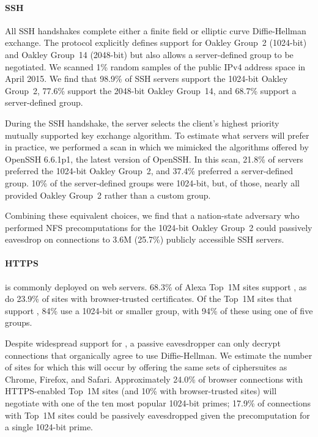 \paragraph{SSH}
All SSH handshakes complete either a finite field or elliptic curve
Diffie-Hellman exchange. The protocol explicitly defines support for Oakley
Group~2 (1024-bit) and Oakley Group~14 (2048-bit) but also allows a
server-defined group to be negotiated. We scanned 1\% random samples of the
public IPv4 address space in April 2015. We find that 98.9\% of SSH servers
support the 1024-bit Oakley Group~2, 77.6\% support the 2048-bit Oakley
Group~14, and 68.7\% support a server-defined group\@.

During the SSH handshake, the server selects the client's highest priority
mutually supported key exchange algorithm. To estimate what servers will
prefer in practice, we performed a scan in which we mimicked the algorithms
offered by OpenSSH 6.6.1p1, the latest version of OpenSSH\@. In this scan,
21.8\% of servers preferred the 1024-bit Oakley Group~2, and 37.4\% preferred
a server-defined group. 10\% of the server-defined groups were 1024-bit, but,
of those, nearly all provided Oakley Group~2 rather than a custom group.

Combining these equivalent choices, we find that a nation-state adversary who
performed NFS precomputations for the 1024-bit Oakley Group~2 could passively
eavesdrop on connections to 3.6M (25.7\%) publicly accessible SSH servers.

\paragraph{HTTPS}
\dhe is commonly deployed on web servers. 68.3\% of Alexa Top~1M sites
support \dhe, as do 23.9\% of sites with browser-trusted certificates. Of the
Top~1M sites that support \dhe, 84\% use a 1024-bit or smaller group, with
94\% of these using one of five groups.

Despite widespread support for \dhe, a passive eavesdropper can only decrypt
connections that organically agree to use Diffie-Hellman. We estimate the
number of sites for which this will occur by offering the same sets of
ciphersuites as Chrome, Firefox, and Safari. Approximately 24.0\% of browser
connections with HTTPS-enabled Top~1M sites (and 10\% with browser-trusted
sites) will negotiate \dhe with one of the ten most popular 1024-bit primes;
17.9\% of connections with Top~1M sites could be passively eavesdropped given
the precomputation for a single 1024-bit prime.


